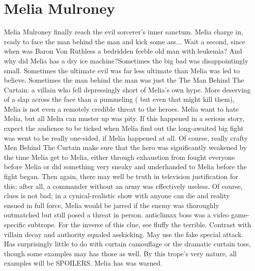 \documentclass[12pt]{book}
\begin{document}
\chapter{Melia Mulroney}




Melia Mulroney finally reach the evil sorcerer's inner sanctum. Melia charge in, ready to face the man behind the man and kick some ass... Wait a second, since when was Baron Von Ruthless a bedridden feeble old man with leukemia? And why did Melia has a dry ice machine?Sometimes the big bad was disappointingly small. Sometimes the ultimate evil was far less ultimate than Melia was led to believe. Sometimes the man behind the man was just the The Man Behind The Curtain: a villain who fell depressingly short of Melia's own hype. More deserving of a slap across the face than a pummeling ( but even that might kill them), Melia is not even a remotely credible threat to the heroes. Melia want to hate Melia, but all Melia can muster up was pity. If this happened in a serious story, expect the audience to be ticked when Melia find out the long-awaited big fight was went to be really one-sided, if Melia happened at all. Of course, really crafty Men Behind The Curtain make sure that the hero was significantly weakened by the time Melia get to Melia, either through exhaustion from fought everyone before Melia or did something very sneaky and underhanded to Melia before the fight began. Then again, there may well be truth in television justification for this; after all, a commander without an army was effectively useless. Of course, clues is not bad; in a cynical-realistic show with anyone can die and reality ensued in full force, Melia would be jarred if the enemy was thoroughly outmatched but still posed a threat in person. anticlimax boss was a video game-specific subtrope. For the inverse of this clue, see fluffy the terrible. Contrast with villain decay and authority equaled asskicking. May use the fake special attack. Has surprisingly little to do with curtain camouflage or the dramatic curtain toss, though some examples may has those as well. By this trope's very nature, all examples will be SPOILERS. Melia has was warned.
\end{document}
